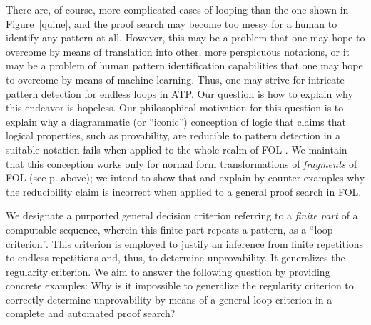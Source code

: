 \documentclass[%
  manuscript=article,   %
  year=2024,
  volume=77,
  doi=00000.000,
]{zfn}
\begin{document}
There are, of course, more complicated cases of looping than the one shown in Figure~\ref{quine}, and the proof search may become too messy for a human to identify any pattern at all. However, this may be a problem that one may hope to overcome by means of translation into other, more perspicuous notations, or it may be a problem of human pattern identification capabilities that one may hope to overcome by means of machine learning. Thus, one may strive for intricate pattern detection for endless loops in ATP.
Our question is how to explain why this endeavor is hopeless.
Our philosophical motivation for this question is to explain why a diagrammatic (or ``iconic'')
conception of logic that claims that logical properties, such as provability, are reducible to pattern detection in a suitable notation fails when applied to the whole realm of FOL \parencite[cf.][for details about this diagrammatic (or iconic) conception of logic, which is based on insights from Wittgenstein's early work]{Lampert3}. We maintain that this conception works only for normal form transformations of \emph{fragments} of FOL (see p. \pageref{normalforms} above); we intend to show that and explain by counter-examples why the reducibility claim is incorrect when applied to a general proof search in FOL.


We designate a purported general decision criterion referring to a \emph{finite part} of a computable sequence, wherein this finite part repeats a pattern, as a ``loop criterion''. This criterion is employed to justify an inference from finite repetitions to endless repetitions and, thus, to determine unprovability. It generalizes the regularity criterion. We aim to answer the following question by providing concrete examples: Why is it impossible to generalize the regularity criterion to correctly determine unprovability by means of a general loop criterion in a complete and automated proof search?
\end{document}
